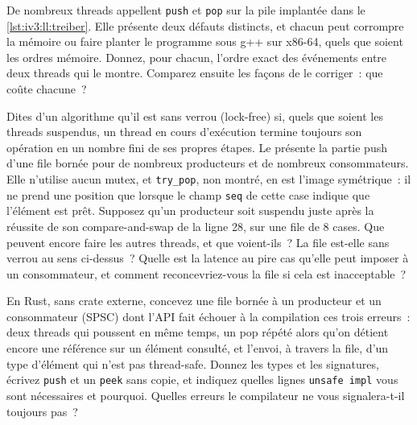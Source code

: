 \begin{question}\label{iq:iv3:low-latency:32}
De nombreux threads appellent \texttt{push} et \texttt{pop} sur la pile implantée dans le \cref{lst:iv3:ll:treiber}. Elle présente deux défauts distincts, et chacun peut corrompre la mémoire ou faire planter le programme sous g++ sur x86-64, quels que soient les ordres mémoire. Donnez, pour chacun, l'ordre exact des événements entre deux threads qui le montre. Comparez ensuite les façons de le corriger~: que coûte chacune~?
\label{lst:iv3:ll:treiber}
\end{question}

\begin{question}\label{iq:iv3:low-latency:33}
Dites d'un algorithme qu'il est sans verrou (lock-free) si, quels que soient les threads suspendus, un thread en cours d'exécution termine toujours son opération en un nombre fini de ses propres étapes. Le  présente la partie push d'une file bornée pour de nombreux producteurs et de nombreux consommateurs. Elle n'utilise aucun mutex, et \texttt{try\_pop}, non montré, en est l'image symétrique~: il ne prend une position que lorsque le champ \texttt{seq} de cette case indique que l'élément est prêt. Supposez qu'un producteur soit suspendu juste après la réussite de son compare-and-swap de la ligne 28, sur une file de 8 cases. Que peuvent encore faire les autres threads, et que voient-ils~? La file est-elle sans verrou au sens ci-dessus~? Quelle est la latence au pire cas qu'elle peut imposer à un consommateur, et comment reconcevriez-vous la file si cela est inacceptable~?
\label{lst:iv3:ll:mpmc}
\end{question}

\begin{question}\label{iq:iv3:low-latency:34}
En Rust, sans crate externe, concevez une file bornée à un producteur et un consommateur (SPSC) dont l'API fait échouer à la compilation ces trois erreurs~: deux threads qui poussent en même temps, un pop répété alors qu'on détient encore une référence sur un élément consulté, et l'envoi, à travers la file, d'un type d'élément qui n'est pas thread-safe. Donnez les types et les signatures, écrivez \texttt{push} et un \texttt{peek} sans copie, et indiquez quelles lignes \texttt{unsafe impl} vous sont nécessaires et pourquoi. Quelles erreurs le compilateur ne vous signalera-t-il toujours pas~?
\end{question}

